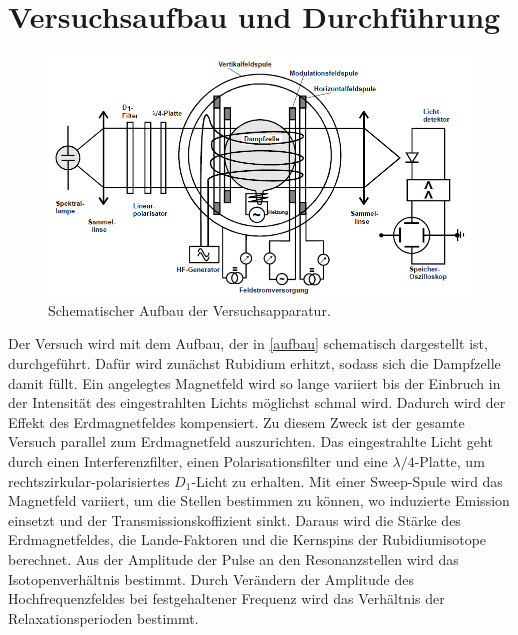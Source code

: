 \section{Versuchsaufbau und Durchführung}

\begin{figure}[h]
\centering
\includegraphics[width=\textwidth]{img/aufbau.png}
\caption{Schematischer Aufbau der Versuchsapparatur\cite{FP}.}
\label{aufbau}
\end{figure}

Der Versuch wird mit dem Aufbau, der in \autoref{aufbau} schematisch dargestellt ist, durchgeführt. Dafür wird
zunächst Rubidium erhitzt, sodass sich die Dampfzelle damit füllt. Ein angelegtes Magnetfeld wird so lange variiert
bis der Einbruch in der Intensität des eingestrahlten Lichts möglichst schmal wird. Dadurch wird der Effekt des
Erdmagnetfeldes kompensiert. Zu diesem Zweck ist der gesamte Versuch parallel zum Erdmagnetfeld auszurichten. Das
eingestrahlte Licht geht durch einen Interferenzfilter, einen Polarisationsfilter und eine $\lambda/4$-Platte, um
rechtszirkular-polarisiertes $D_1$-Licht zu erhalten. Mit einer Sweep-Spule wird das Magnetfeld variiert, um die
Stellen bestimmen zu können, wo induzierte Emission einsetzt und der Transmissionskoffizient sinkt. Daraus wird die
Stärke des Erdmagnetfeldes, die Lande-Faktoren und die Kernspins der Rubidiumisotope berechnet. Aus der Amplitude
der Pulse an den Resonanzstellen wird das Isotopenverhältnis bestimmt. Durch Verändern der Amplitude des
Hochfrequenzfeldes bei festgehaltener Frequenz wird das Verhältnis der Relaxationsperioden bestimmt.
